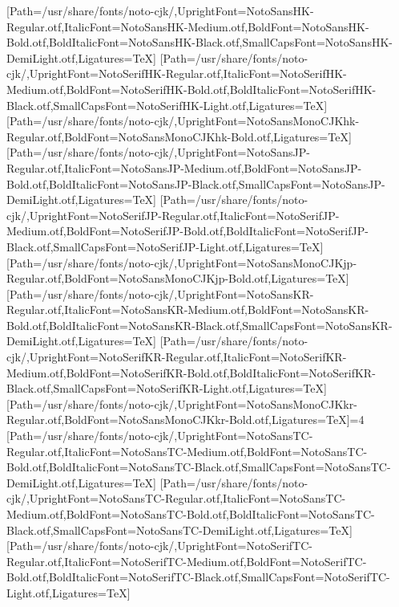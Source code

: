 \newfontfamily{}[Path=/usr/share/fonts/noto-cjk/,UprightFont=NotoSansHK-Regular.otf,ItalicFont=NotoSansHK-Medium.otf,BoldFont=NotoSansHK-Bold.otf,BoldItalicFont=NotoSansHK-Black.otf,SmallCapsFont=NotoSansHK-DemiLight.otf,Ligatures=TeX]
\newfontfamily{}[Path=/usr/share/fonts/noto-cjk/,UprightFont=NotoSerifHK-Regular.otf,ItalicFont=NotoSerifHK-Medium.otf,BoldFont=NotoSerifHK-Bold.otf,BoldItalicFont=NotoSerifHK-Black.otf,SmallCapsFont=NotoSerifHK-Light.otf,Ligatures=TeX]
\newfontfamily{}[Path=/usr/share/fonts/noto-cjk/,UprightFont=NotoSansMonoCJKhk-Regular.otf,BoldFont=NotoSansMonoCJKhk-Bold.otf,Ligatures=TeX]
\newfontfamily{}[Path=/usr/share/fonts/noto-cjk/,UprightFont=NotoSansJP-Regular.otf,ItalicFont=NotoSansJP-Medium.otf,BoldFont=NotoSansJP-Bold.otf,BoldItalicFont=NotoSansJP-Black.otf,SmallCapsFont=NotoSansJP-DemiLight.otf,Ligatures=TeX]
\newfontfamily{}[Path=/usr/share/fonts/noto-cjk/,UprightFont=NotoSerifJP-Regular.otf,ItalicFont=NotoSerifJP-Medium.otf,BoldFont=NotoSerifJP-Bold.otf,BoldItalicFont=NotoSerifJP-Black.otf,SmallCapsFont=NotoSerifJP-Light.otf,Ligatures=TeX]
\newfontfamily{}[Path=/usr/share/fonts/noto-cjk/,UprightFont=NotoSansMonoCJKjp-Regular.otf,BoldFont=NotoSansMonoCJKjp-Bold.otf,Ligatures=TeX]
\newfontfamily{}[Path=/usr/share/fonts/noto-cjk/,UprightFont=NotoSansKR-Regular.otf,ItalicFont=NotoSansKR-Medium.otf,BoldFont=NotoSansKR-Bold.otf,BoldItalicFont=NotoSansKR-Black.otf,SmallCapsFont=NotoSansKR-DemiLight.otf,Ligatures=TeX]
\newfontfamily{}[Path=/usr/share/fonts/noto-cjk/,UprightFont=NotoSerifKR-Regular.otf,ItalicFont=NotoSerifKR-Medium.otf,BoldFont=NotoSerifKR-Bold.otf,BoldItalicFont=NotoSerifKR-Black.otf,SmallCapsFont=NotoSerifKR-Light.otf,Ligatures=TeX]
\newfontfamily{}[Path=/usr/share/fonts/noto-cjk/,UprightFont=NotoSansMonoCJKkr-Regular.otf,BoldFont=NotoSansMonoCJKkr-Bold.otf,Ligatures=TeX]\else\ifnum\value{NotoCJKFamily}=4
\newfontfamily{}[Path=/usr/share/fonts/noto-cjk/,UprightFont=NotoSansTC-Regular.otf,ItalicFont=NotoSansTC-Medium.otf,BoldFont=NotoSansTC-Bold.otf,BoldItalicFont=NotoSansTC-Black.otf,SmallCapsFont=NotoSansTC-DemiLight.otf,Ligatures=TeX]
\newfontfamily{}[Path=/usr/share/fonts/noto-cjk/,UprightFont=NotoSansTC-Regular.otf,ItalicFont=NotoSansTC-Medium.otf,BoldFont=NotoSansTC-Bold.otf,BoldItalicFont=NotoSansTC-Black.otf,SmallCapsFont=NotoSansTC-DemiLight.otf,Ligatures=TeX]
\newfontfamily{}[Path=/usr/share/fonts/noto-cjk/,UprightFont=NotoSerifTC-Regular.otf,ItalicFont=NotoSerifTC-Medium.otf,BoldFont=NotoSerifTC-Bold.otf,BoldItalicFont=NotoSerifTC-Black.otf,SmallCapsFont=NotoSerifTC-Light.otf,Ligatures=TeX]
